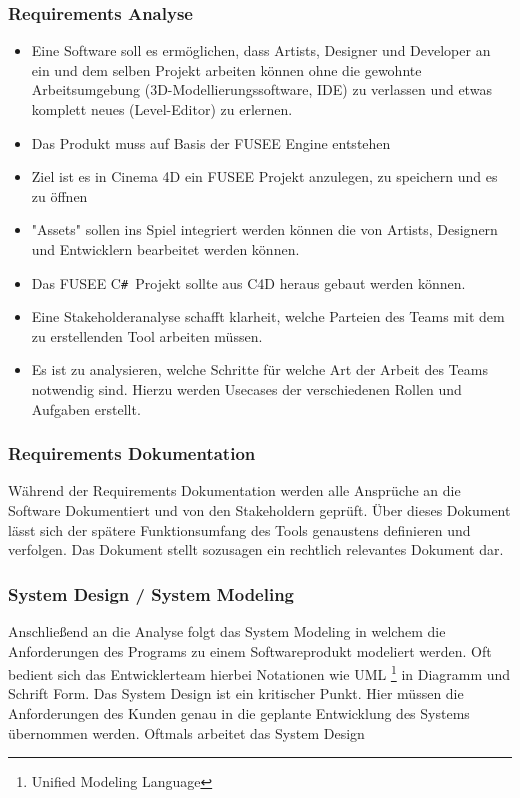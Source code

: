 \documentclass[pagesize, paper=a4, fontsize=12pt,titlepage=true, headings=small, headnosepline, abstractoff, liststotoc, nochapterprefix, plainheadsepline, twoside]{scrreprt}
\newcommand{\CSS}{C\texttt{\# }}
\begin{document}
\subsubsection{Requirements Analyse}
\begin{itemize}
\item Eine Software soll es ermöglichen, dass Artists, Designer und Developer an ein und dem selben Projekt arbeiten können ohne die gewohnte Arbeitsumgebung (3D-Modellierungssoftware, IDE) zu verlassen und etwas komplett neues (Level-Editor) zu erlernen.
\item Das Produkt muss auf Basis der FUSEE Engine entstehen
\item Ziel ist es in Cinema 4D ein FUSEE Projekt anzulegen, zu speichern und es zu öffnen
\item "Assets" sollen ins Spiel integriert werden können die von Artists, Designern und Entwicklern bearbeitet werden können.
\item Das FUSEE \CSS Projekt sollte aus C4D heraus gebaut werden können.
\item Eine Stakeholderanalyse schafft klarheit, welche Parteien des Teams mit dem zu erstellenden Tool arbeiten müssen.
\item Es ist zu analysieren, welche Schritte für welche Art der Arbeit des Teams notwendig sind. Hierzu werden Usecases der verschiedenen Rollen und Aufgaben erstellt.
\end{itemize}
\subsubsection{Requirements Dokumentation}
Während der Requirements Dokumentation werden alle Ansprüche an die Software Dokumentiert und von den Stakeholdern geprüft. Über dieses Dokument lässt sich der spätere Funktionsumfang des Tools genaustens definieren und verfolgen. Das Dokument stellt sozusagen ein rechtlich relevantes Dokument dar.

\subsubsection{System Design / System Modeling}
Anschließend an die Analyse folgt das System Modeling in welchem die Anforderungen des Programs zu einem Softwareprodukt modeliert werden. Oft bedient sich das Entwicklerteam hierbei Notationen wie UML \footnote{Unified Modeling Language} in Diagramm und Schrift Form. Das System Design ist ein kritischer Punkt. Hier müssen die Anforderungen des Kunden genau in die geplante Entwicklung des Systems übernommen werden. Oftmals arbeitet das System Design 
\end{document}

